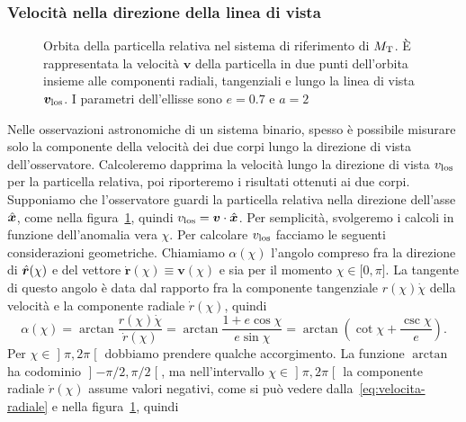 {\subsubsection{Velocità nella direzione della linea di vista}
\label{sec:velocita-linea-di-vista}

\begin{figure}
  \centering
  
  \caption[Velocità nella direzione della linea di vista]{Orbita della
    particella relativa nel sistema di riferimento di $M_\textup{T}$. È
    rappresentata la velocità $\bm{v}$ della particella in due punti dell'orbita
    insieme alle componenti radiali, tangenziali e lungo la linea di vista
    $\bm{v}_\textup{los}$. I parametri dell'ellisse sono $e=0.7$ e $a=2$}
  \label{fig:ellisse-vlos}
\end{figure}
Nelle osservazioni astronomiche di un sistema binario, spesso è possibile
misurare solo la componente della velocità dei due corpi lungo la direzione di
vista dell'osservatore. Calcoleremo dapprima la velocità lungo la direzione di
vista $v_\textup{los}$ per la particella relativa, poi riporteremo i risultati
ottenuti ai due corpi. Supponiamo che l'osservatore guardi la particella
relativa nella direzione dell'asse $\hat{\bm{x}}$, come nella
figura~\ref{fig:ellisse-vlos}, quindi $v_\textup{los} = \bm{v}\cdot\hat{\bm{x}}$.
Per semplicità, svolgeremo i calcoli in funzione dell'anomalia vera $\chi$. Per
calcolare $v_\textup{los}$ facciamo le seguenti considerazioni
geometriche. Chiamiamo $\alpha(\chi)$ l'angolo compreso fra la direzione di
$\hat{\bm{r}}(\chi)$ e del vettore $\dot{\bm{r}}(\chi) \equiv \bm{v}(\chi)$ e sia
per il momento $\chi \in \mathopen{[}0, \pi\mathclose{]}$. La tangente di questo
angolo è data dal rapporto fra la componente tangenziale $r(\chi)\dot{\chi}$
della velocità e la componente radiale $\dot{r}(\chi)$, quindi
\begin{equation}
  \label{eq:angolo-alpha}
  \alpha(\chi) = \arctan\frac{r(\chi)\dot{\chi}}{\dot{r}(\chi)} =
  \arctan\frac{1 + e\cos\chi}{e\sin\chi} = \arctan
  \left(
    \cot\chi + \frac{\csc\chi}{e}
  \right).
\end{equation}
Per $\chi \in \mathopen{]}\pi, 2\pi\mathclose{[}$ dobbiamo prendere qualche
accorgimento. La funzione $\arctan$ ha codominio
$\mathopen{]}-\pi/2, \pi/2\mathclose{[}$, ma nell'intervallo
$\chi \in \mathopen{]}\pi, 2\pi\mathclose{[}$ la componente radiale
$\dot{r}(\chi)$ assume valori negativi, come si può vedere
dalla~\eqref{eq:velocita-radiale} e nella figura~\ref{fig:ellisse-vlos}, quindi
}
